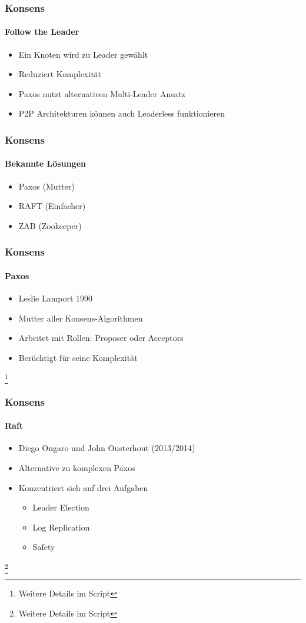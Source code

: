 \begin{frame}
  \frametitle{Konsens}
  \framesubtitle{Follow the Leader}
  \begin{itemize}
    \item Ein Knoten wird zu Leader gewählt
    \item Reduziert Komplexität
    \item Paxos nutzt alternativen Multi-Leader Ansatz
    \item P2P Architekturen können auch Leaderless funktionieren
  \end{itemize}
\end{frame}


\begin{frame}
  \frametitle{Konsens}
  \framesubtitle{Bekannte Lösungen}
  \begin{itemize}
    \item Paxos (Mutter)
    \item RAFT (Einfacher)
    \item ZAB (Zookeeper)
  \end{itemize}
\end{frame}

\begin{frame}
  \frametitle{Konsens}
  \framesubtitle{Paxos}
  \begin{itemize}
    \item Leslie Lamport 1990
    \item Mutter aller Konsens-Algorithmen
    \item Arbeitet mit Rollen: Proposer oder Acceptors
    \item Berüchtigt für seine Komplexität
  \end{itemize}
  \footnote{Weitere Details im Script}
\end{frame}

\begin{frame}
  \frametitle{Konsens}
  \framesubtitle{Raft}
  \begin{itemize}
    \item Diego Ongaro und John Ousterhout (2013/2014)
    \item Alternative zu komplexen Paxos
    \item Konzentriert sich auf drei Aufgaben
    \begin{itemize}
      \item Leader Election
      \item Log Replication  
      \item Safety
    \end{itemize}
  \end{itemize}
  \footnote{Weitere Details im Script}
\end{frame}

